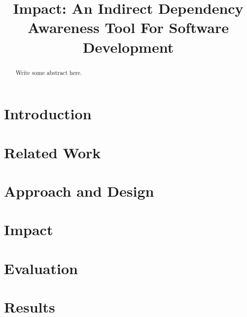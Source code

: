 \documentclass[conference]{IEEEtran}
\begin{document}
\title{Impact: An Indirect Dependency Awareness Tool For Software Development}

\author{
\and
{}
}

\maketitle

\begin{abstract}
Write some abstract here.
\end{abstract}


\section{Introduction}



\section{Related Work}



\section{Approach and Design}



\section{Impact}



\section{Evaluation}



\section{Results}
\end{document}
